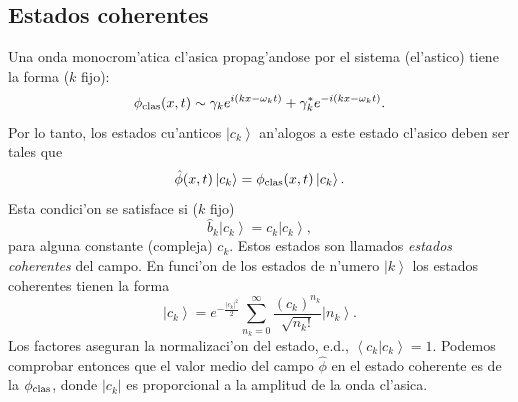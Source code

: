 \subsection{Estados coherentes}
Una onda monocrom'atica cl'asica propag'andose por el sistema (el'astico) tiene
la forma ($k$ fijo):
\begin{equation}
\phi_{\rm clas}(x,t)\sim\gamma_k e^{i(kx-\omega_k t)}+\gamma_k^*
e^{-i(kx-\omega_k t)}.
\end{equation}
Por lo tanto, los estados cu'anticos $\left|c_k\right>$ an'alogos a este estado
cl'asico deben ser tales que
\begin{equation}
\hat{\phi}(x,t)\left|c_k\right>=\phi_{\rm clas}(x,t)\left|c_k\right>.
\end{equation}
Esta condici'on se satisface si ($k$ fijo)
\begin{equation}
\hat{b}_k\left|c_k\right>=c_k\left|c_k\right>,
\end{equation}
para alguna constante (compleja) $c_k$. Estos estados son llamados
\textit{estados coherentes} del campo. En funci'on de los estados de n'umero
$\left|k\right>$ los estados coherentes tienen la forma
\begin{equation}
\left| c_k\right> =e^{-\frac{\left| c_k\right|
^{2}}{2}}\sum_{n_k=0}^{\infty}\frac{\left( c_k\right)^{n_k}}{\sqrt{n_k!}}\left|
n_k\right>.
\end{equation}
Los factores aseguran la normalizaci'on del estado, e.d., $\left< c_k\right|
\left. c_k\right>=1 $. Podemos comprobar entonces que el valor medio del campo
$\hat\phi$ en el estado coherente es de la $\phi_{\rm clas}$, donde $|c_k|$ es
proporcional a la amplitud de la onda cl'asica.
